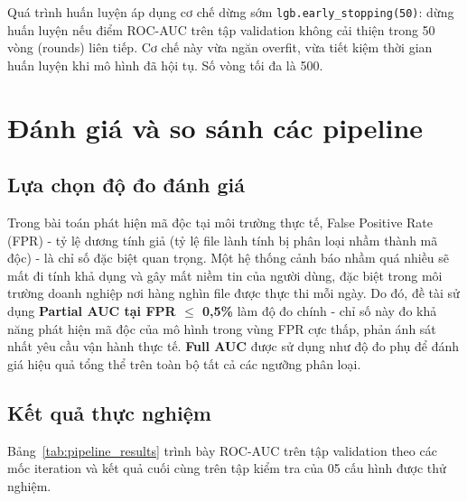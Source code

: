 Quá trình huấn luyện áp dụng cơ chế dừng sớm
\texttt{lgb.early\_stopping(50)}: dừng huấn luyện nếu điểm ROC-AUC
trên tập validation không cải thiện trong 50 vòng (rounds) liên tiếp.
Cơ chế này vừa ngăn overfit, vừa tiết kiệm thời gian huấn luyện khi
mô hình đã hội tụ. Số vòng tối đa là 500.





\section{Đánh giá và so sánh các pipeline}

\subsection{Lựa chọn độ đo đánh giá}

Trong bài toán phát hiện mã độc tại môi trường thực tế, False Positive
Rate (FPR) - tỷ lệ dương tính giả (tỷ lệ file lành tính bị phân loại nhầm thành mã độc)
- là chỉ số đặc biệt quan trọng. Một hệ thống cảnh báo nhầm quá
nhiều sẽ mất đi tính khả dụng và gây mất niềm tin của người dùng,
đặc biệt trong môi trường doanh nghiệp nơi hàng nghìn file được thực
thi mỗi ngày. Do đó, đề tài sử dụng \textbf{Partial AUC tại FPR
$\leq$ 0,5\%} làm độ đo chính - chỉ số này đo khả năng phát hiện
mã độc của mô hình trong vùng FPR cực thấp, phản ánh sát nhất yêu
cầu vận hành thực tế. \textbf{Full AUC} được sử dụng như độ đo phụ
để đánh giá hiệu quả tổng thể trên toàn bộ tất cả các ngưỡng phân loại.




\subsection{Kết quả thực nghiệm}

Bảng~\ref{tab:pipeline_results} trình bày ROC-AUC trên tập validation
theo các mốc iteration và kết quả cuối cùng trên tập kiểm tra của 05
cấu hình được thử nghiệm.

